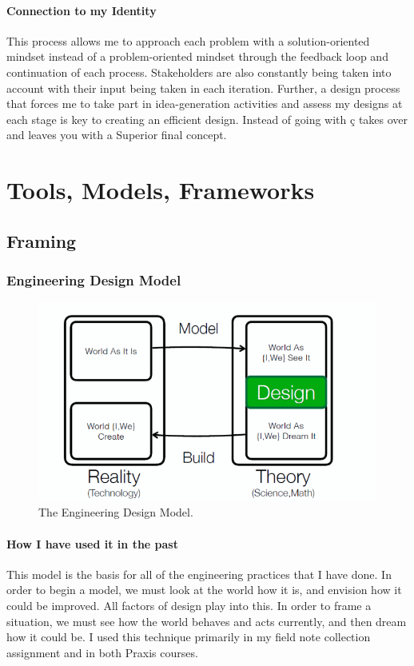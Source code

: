 \documentclass[paper=a4, fontsize=11pt]{article} %
\begin{document}
    \paragraph{Connection to my Identity}
    This process allows me to approach each problem with a solution-oriented mindset instead of a problem-oriented mindset through the feedback loop and continuation of each process. Stakeholders are also constantly being taken into account with their input being taken in each iteration. Further, a design process that forces me to take part in idea-generation activities and assess my designs at each stage is key to creating an efficient design. Instead of going with ç takes over and leaves you with a Superior final concept.

\section{Tools, Models, Frameworks}
    \subsection{Framing}
        \subsubsection{Engineering Design Model}
            \begin{figure}[H]
                \centering
	            \includegraphics[width=0.6\linewidth]{designmodel.png}
	            \caption{The Engineering Design Model.}
            \end{figure}
            \paragraph{How I have used it in the past}
            \cite{edm} This model is the basis for all of the engineering practices that I have done. In order to begin a model, we must look at the world how it is, and envision how it could be improved. All factors of design play into this. In order to frame a situation, we must see how the world behaves and acts currently, and then dream how it could be. I used this technique primarily in my field note collection assignment and in both Praxis courses.
\end{document}
